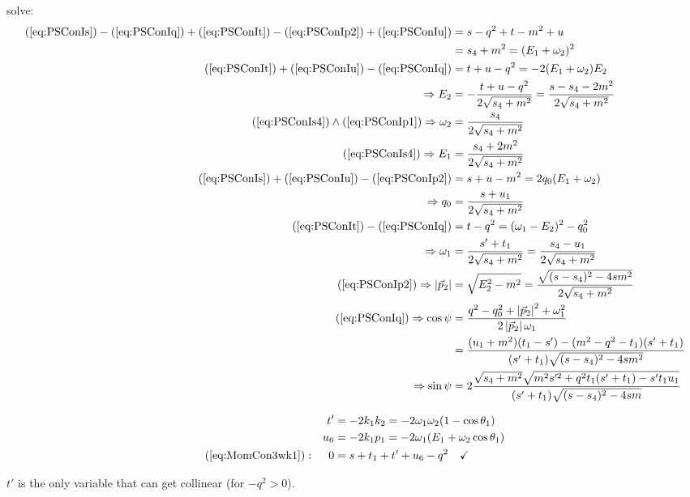 solve:
\begin{align}
(\ref{eq:PSConIs}) - (\ref{eq:PSConIq}) + (\ref{eq:PSConIt}) - (\ref{eq:PSConIp2}) + (\ref{eq:PSConIu}) &= s-q^2+t-m^2+u\\
 &= s_4+m^2 = (E_1+\omega_2)^2 \label{eq:PSConIs4}\\
(\ref{eq:PSConIt}) + (\ref{eq:PSConIu}) - (\ref{eq:PSConIq}) &= t+u-q^2 = -2(E_1+\omega_2)E_2\\
\Rightarrow E_2 &= -\frac{t+u-q^2}{2\sqrt{s_4+m^2}} =\frac{s-s_4-2m^2}{2\sqrt{s_4+m^2}} \label{eq:PSConIE2}\\
(\ref{eq:PSConIs4})\land (\ref{eq:PSConIp1}) \Rightarrow \omega_2 &= \frac{s_4}{2\sqrt{s_4+m^2}} \label{eq:PSConIom2} \\
(\ref{eq:PSConIs4})\Rightarrow E_1 &= \frac{s_4+2m^2}{2\sqrt{s_4+m^2}} \label{eq:PSConIE1} \\
(\ref{eq:PSConIs})+(\ref{eq:PSConIu})-(\ref{eq:PSConIp2}) &= s+u-m^2 =2q_0(E_1+\omega_2)\\
\Rightarrow q_0 &= \frac{s+u_1}{2\sqrt{s_4+m^2}} \label{eq:PSConIq0}\\
(\ref{eq:PSConIt}) - (\ref{eq:PSConIq}) &= t-q^2 = (\omega_1-E_2)^2 - q_0^2\\
\Rightarrow \omega_1 &= \frac{s'+t_1}{2\sqrt{s_4+m^2}} = \frac{s_4-u_1}{2\sqrt{s_4+m^2}}\label{eq:PSConIom1}\\
(\ref{eq:PSConIp2}) \Rightarrow \left|\vec p_2\right| &= \sqrt{E_2^2 - m^2} = \frac {\sqrt{(s-s_4)^2-4sm^2}} {2\sqrt{s_4+m^2}}\label{eq:PSConIabsp2}\\
(\ref{eq:PSConIq}) \Rightarrow \cos\psi &= \frac{q^2-q_0^2+\left|\vec p_2\right|^2+\omega_1^2}{2\left|\vec p_2\right|\omega_1}\\
 &= \frac {(u_1+m^2)(t_1-s')-(m^2-q^2-t_1)(s'+t_1)} {(s'+t_1)\sqrt{(s-s_4)^2-4sm^2}}\label{eq:PSConIabcos}\\
\Rightarrow \sin\psi &= 2\frac{\sqrt{s_4+m^2}\sqrt{m^2s'^2+q^2t_1(s'+t_1)-s't_1u_1}}{(s'+t_1)\sqrt{(s-s_4)^2-4sm}}
\end{align}

\begin{align}
&&t' &= -2k_1k_2 = -2\omega_1\omega_2(1-\cos\theta_1)\\
&&u_6 &= - 2k_1p_1 = -2\omega_1(E_1 + \omega_2\cos\theta_1)\\
(\ref{eq:MomCon3wk1}): &&0 &= s+t_1+t'+u_6-q^2\quad\checkmark
\end{align}

$t'$ is the only variable that can get collinear (for $-q^2 > 0$).

